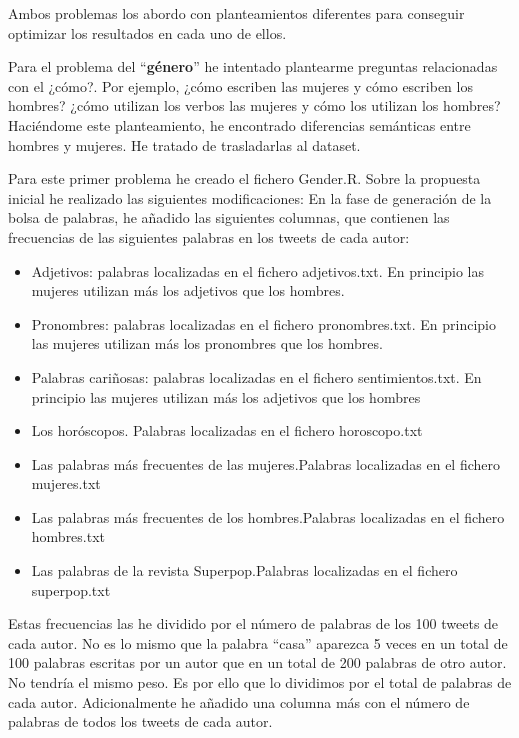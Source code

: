 \documentclass[11pt,a4paper]{article}
\begin{document}
Ambos problemas los abordo con planteamientos diferentes para conseguir optimizar los resultados en cada uno de ellos.\newline

Para el problema del “\textbf{\textbf{g\'enero}}” he intentado plantearme preguntas relacionadas con el ¿c\'omo?. Por ejemplo, ¿c\'omo escriben las mujeres y c\'omo escriben los hombres? ¿c\'omo utilizan los verbos las mujeres y c\'omo los utilizan los hombres? Haci\'endome este planteamiento, he encontrado diferencias sem\'anticas entre hombres y mujeres. He tratado de trasladarlas al dataset.\newline

Para este primer problema he creado el fichero Gender.R.\newline
Sobre la propuesta inicial he realizado las siguientes modificaciones:\newline
En la fase de generaci\'on de la bolsa de palabras, he a\~nadido las siguientes columnas, que contienen las frecuencias  de las siguientes palabras en los tweets de cada autor:
\begin{itemize}
 \item Adjetivos: palabras localizadas en el fichero adjetivos.txt. En principio las mujeres utilizan m\'as los adjetivos que los hombres.
 \item Pronombres: palabras localizadas en el fichero pronombres.txt. En principio las mujeres utilizan m\'as los pronombres que los hombres.
 \item Palabras cari\~nosas: palabras localizadas en el fichero sentimientos.txt. En principio las mujeres utilizan m\'as los adjetivos que los hombres
 \item Los hor\'oscopos. Palabras localizadas en el fichero horoscopo.txt
 \item Las palabras m\'as frecuentes de las mujeres.Palabras localizadas en el fichero mujeres.txt
 \item Las palabras m\'as frecuentes de los hombres.Palabras localizadas en el fichero hombres.txt
 \item Las palabras de la revista Superpop.Palabras localizadas en el fichero superpop.txt

\end{itemize}


Estas frecuencias las he dividido por el n\'umero de palabras de los 100 tweets de cada autor. \newline
No es lo mismo que la palabra “casa” aparezca 5 veces en un total de 100 palabras escritas por un autor que en un total de 200 palabras de otro autor. No tendr\'ia el mismo peso. Es por ello que lo dividimos por el total de palabras de cada autor.\newline
Adicionalmente he a\~nadido una columna m\'as con el n\'umero de palabras de todos los tweets de cada autor.\newline
\end{document}
